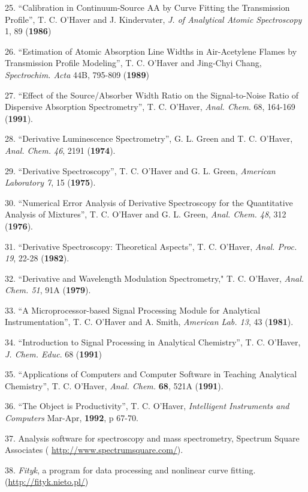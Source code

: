 25. ``Calibration in Continuum-Source AA by Curve Fitting the Transmission Profile'', T. C. O'Haver and J. Kindervater, \textit{J. of Analytical Atomic Spectroscopy} 1, 89 (\textbf{1986})

26. ``Estimation of Atomic Absorption Line Widths in Air-Acetylene Flames by Transmission Profile Modeling'', T. C. O'Haver and Jing-Chyi Chang, \textit{Spectrochim. Acta} 44B, 795-809 (\textbf{1989})

27. ``Effect of the Source/Absorber Width Ratio on the Signal-to-Noise Ratio of Dispersive Absorption Spectrometry'', T. C. O'Haver, \textit{Anal. Chem}. 68, 164-169 (\textbf{1991}).

28. ``Derivative Luminescence Spectrometry'', G. L. Green and T. C. O'Haver, \textit{Anal. Chem. 46}, 2191 (\textbf{1974}).

29. ``Derivative Spectroscopy'', T. C. O'Haver and G. L. Green, \textit{American Laboratory 7}, 15 (\textbf{1975}). 

30. ``Numerical Error Analysis of Derivative Spectroscopy for the Quantitative Analysis of Mixtures'', T. C. O'Haver and G. L. Green, \textit{Anal. Chem. 48}, 312 (\textbf{1976}).

31. ``Derivative Spectroscopy: Theoretical Aspects'', T. C. O'Haver, \textit{Anal. Proc. 19}, 22-28 (\textbf{1982}).

32. ``Derivative and Wavelength Modulation Spectrometry," T. C. O'Haver, \textit{Anal. Chem. 51}, 91A (\textbf{1979}).

33. ``A Microprocessor-based Signal Processing Module for Analytical Instrumentation'', T. C. O'Haver and A. Smith, \textit{American Lab. 13}, 43 (\textbf{1981}). 

34. ``Introduction to Signal Processing in Analytical Chemistry'', T. C. O'Haver, \textit{J. Chem. Educ}. 68 (\textbf{1991})

35. ``Applications of Computers and Computer Software in Teaching Analytical Chemistry'', T. C. O'Haver, \textit{Anal. Chem.} \textbf{68}, 521A (\textbf{1991}).

36. ``The Object is Productivity'', T. C. O'Haver, \textit{Intelligent Instruments and Computers} Mar-Apr, \textbf{1992}, p 67-70. 

37. Analysis software for spectroscopy and mass spectrometry, Spectrum Square Associates ( \url{http://www.spectrumsquare.com/}).

38. \textit{Fityk}, a program for data processing and nonlinear curve fitting. (\url{http://fityk.nieto.pl/})

